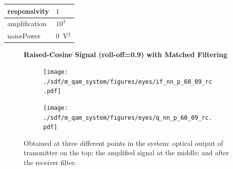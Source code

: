 \begin{refsection}
\begin{table}[H]
\begin{tabular}{|l|l|}
				responsivity           & $1$                                                        \\ \hline
				amplification          & $10^3$                                                     \\ \hline
				noisePower   & $0$~V$^2$                             					\\ \hline
	\end{tabular}
\end{table}
\begin{figure}[H]
	\centering
	\textbf{Raised-Cosine Signal (roll-off=0.9) with Matched Filtering}
	\begin{minipage}{\linewidth}
		\centering
	\begin{subfigure}{.45\textwidth}
		\centering
		\texttt{[image: ./sdf/m\_qam\_system/figures/eyes/if\_nn\_p\_60\_09\_rc.pdf]}
	\end{subfigure}
	\begin{subfigure}{.45\textwidth}
		\centering
		\texttt{[image: ./sdf/m\_qam\_system/figures/eyes/q\_nn\_p\_60\_09\_rc.pdf]}
	\end{subfigure}
	
	\caption{
		Obtained at
		three different points in the system: optical output of transmitter on the top;
		the amplified signal at the middle; and
		after the receiver filter.
		\label{fig:eyes_nn_rc_09}}
	\end{minipage}
\end{figure}


\end{refsection}
